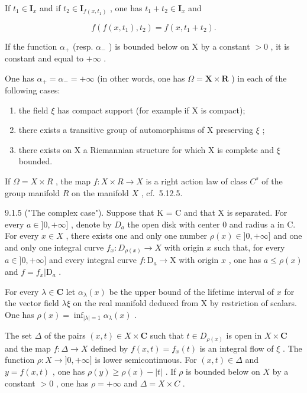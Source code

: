 If \(t_1 \in \mathbf{I}_x\) and if \(t_2 \in \mathbf{I}_{f(x, t_1)}\) , one has \(t_1 + t_2 \in \mathbf{I}_x\) and

\[
f (f (x, t _ {1}), t _ {2}) = f (x, t _ {1} + t _ {2}).\tag{3}
\]

If the function \(\alpha_{+}\) (resp. \(\alpha_{-}\) ) is bounded below on X by a constant \(>0\) , it is constant and equal to \(+\infty\) .

One has \(\alpha_{+} = \alpha_{-} = +\infty\) (in other words, one has \(\Omega = \mathbf{X} \times \mathbf{R}\) ) in each of the following cases:

\begin{enumerate}
\def\labelenumi{(\roman{enumi})}
\item
  the field \(\xi\) has compact support (for example if X is compact);
\item
  there exists a transitive group of automorphisms of X preserving \(\xi\) ;
\item
  there exists on X a Riemannian structure for which X is complete and \(\xi\) bounded.
\end{enumerate}

If \(\Omega = X \times R\) , the map \(f: X \times R \to X\) is a right action law of class \(C^s\) of the group manifold \(R\) on the manifold \(X\) , cf.~5.12.5.

9.1.5 ("The complex case"). Suppose that K = C and that X is separated. For every \(a \in ]0, +\infty]\) , denote by \(D_a\) the open disk with center 0 and radius a in C. For every \(x \in X\) , there exists one and only one number \(\rho(x) \in ]0, +\infty]\) and one and only one integral curve \(f_x: D_{\rho(x)} \to X\) with origin \(x\) such that, for every \(a \in ]0, +\infty]\) and every integral curve \(f: \mathrm{D}_a \to \mathrm{X}\) with origin \(x\) , one has \(a \leqslant \rho(x)\) and \(f = f_x | \mathrm{D}_a\) .

For every \(\lambda\in\mathbf{C}\) let \(\alpha_{\lambda}(x)\) be the upper bound of the lifetime interval of \(x\) for the vector field \(\lambda\xi\) on the real manifold deduced from X by restriction of scalars. One has \(\rho(x)=\inf_{|\lambda|=1}\alpha_{\lambda}(x)\) .

The set \(\Delta\) of the pairs \((x,t)\in X\times\mathbf{C}\) such that \(t\in D_{\rho(x)}\) is open in \(X\times\mathbf{C}\) and the map \(f:\Delta\to X\) defined by \(f(x,t)=f_x(t)\) is an integral flow of \(\xi\) . The function \(\rho:X\to ]0,+\infty]\) is lower semicontinuous. For \((x,t)\in\Delta\) and \(y=f(x,t)\) , one has \(\rho(y)\geqslant\rho(x)-|t|\) . If \(\rho\) is bounded below on \(X\) by a constant \(>0\) , one has \(\rho = +\infty\) and \(\Delta = X \times C\) .

